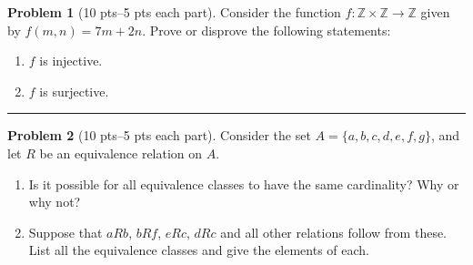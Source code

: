 \documentclass[11pt]{article}
\theoremstyle{definition}
\newtheorem{problem}{Problem}
\theoremstyle{theorem}
\begin{document}
\bigskip
\begin{problem}[10 pts--5 pts each part]
  Consider the function $f: \mathbb{Z} \times \mathbb{Z} \to \mathbb{Z}$ given by $f(m,n) = 7m + 2n$. Prove or disprove
  the following statements:
  \begin{enumerate}
  \item $f$ is injective.
    \vspace{3cm}
  \item $f$ is surjective.
    \vspace{4cm}
  \end{enumerate}
\end{problem}
\hrule

\begin{problem}[10 pts--5 pts each part]
  Consider the set $A=\{a,b,c,d,e,f,g\}$, and let $R$ be an equivalence relation on $A$.
  \begin{enumerate}
  \item Is it possible for all equivalence classes to have the same cardinality?  Why or why not?
    \vspace{4cm}
  \item Suppose that $aRb$, $bRf$, $eRc$, $dRc$ and all other relations follow from these.  List all the equivalence
    classes and give the elements of each.
  \end{enumerate}
\end{problem}
\end{document}
